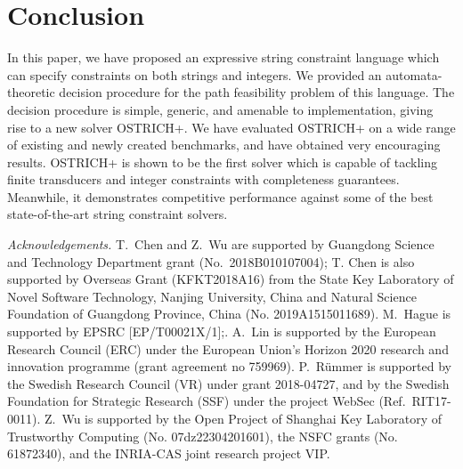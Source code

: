 \documentclass{llncs}
\begin{document}


\vspace{-3mm}
\section{Conclusion} \label{sec:conc}

In this paper, we have proposed  an expressive string constraint language which can specify constraints on both strings and integers.  We provided an automata-theoretic decision procedure for the path feasibility problem of this language. The decision procedure is simple, generic, and amenable to implementation, giving rise to a new solver OSTRICH+.  We have evaluated OSTRICH+ on  a wide range of existing and newly created benchmarks, and have obtained very encouraging results.  OSTRICH+ is shown to be the first solver  which is capable of tackling finite transducers and integer constraints with completeness guarantees. Meanwhile, it demonstrates competitive performance against some of the best state-of-the-art string constraint solvers.


\medskip
\small{
\noindent \emph{Acknowledgements.}
T.~Chen and Z.~Wu are supported by Guangdong Science and Technology Department grant (No.\ 2018B010107004); T. Chen is also supported by Overseas Grant (KFKT2018A16) from the State Key Laboratory of
Novel Software Technology, Nanjing University, China and Natural Science Foundation of Guangdong Province, China (No. 2019A1515011689).
M.~Hague is supported by EPSRC [EP/T00021X/1];.
A.~Lin is supported by the European Research Council (ERC) under the European
Union's Horizon 2020 research and innovation programme (grant agreement no
759969).
P.~R\"ummer is supported by the
Swedish Research Council (VR) under grant 2018-04727, and by the
Swedish Foundation for Strategic Research (SSF) under the project
WebSec (Ref.\ RIT17-0011).
Z.~Wu is supported by  the Open Project of Shanghai Key Laboratory of Trustworthy Computing (No. 07dz22304201601), the NSFC grants (No. 61872340), and the INRIA-CAS joint research project VIP.
}

\vspace{-3mm}




\iftoggle{full}
{
\newpage
\begin{appendix}

\end{appendix}
}
{}%
\end{document}
